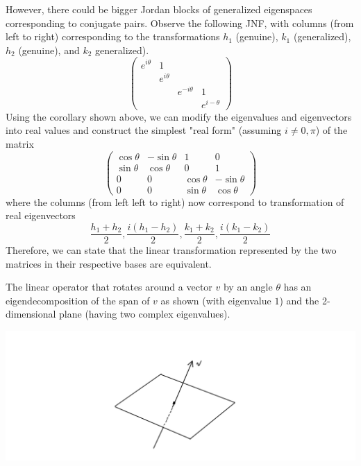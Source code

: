   However, there could be bigger Jordan blocks of generalized eigenspaces corresponding to conjugate pairs. Observe the following JNF, with columns (from left to right) corresponding to the transformations $h_1$ (genuine), $k_1$ (generalized), $h_2$ (genuine), and $k_2$ generalized). 
  \[\begin{pmatrix}
  e^{i \theta} & 1 & & \\
  & e^{i \theta} & & \\
  & & e^{-i \theta} & 1 \\
  & & & e^{i- \theta}
  \end{pmatrix}\]
  Using the corollary shown above, we can modify the eigenvalues and eigenvectors into real values and construct the simplest "real form" (assuming $i \neq 0, \pi$) of the matrix 
  \[\begin{pmatrix}
  \cos{\theta} & - \sin{\theta} & 1 & 0 \\
  \sin{\theta} & \cos{\theta} & 0 & 1 \\
  0 & 0 & \cos{\theta} & - \sin{\theta} \\
  0 & 0 & \sin{\theta} & \cos{\theta}
  \end{pmatrix}\]
  where the columns (from left left to right) now correspond to transformation of real eigenvectors
  \[\frac{h_1 + h_2}{2}, \frac{i(h_1 - h_2)}{2}, \frac{k_1 + k_2}{2}, \frac{i(k_1 - k_2)}{2}\]
  Therefore, we can state that the linear transformation represented by the two matrices in their respective bases are equivalent. 

  \begin{example}
  The linear operator that rotates around a vector $v$ by an angle $\theta$ has an eigendecomposition of the span of $v$ as shown (with eigenvalue $1$) and the 2-dimensional plane (having two complex eigenvalues). 
  \begin{center}
      \includegraphics[scale=0.25]{img/Rotation_Map_Eigendecomposition.PNG}
  \end{center}
  \end{example}

